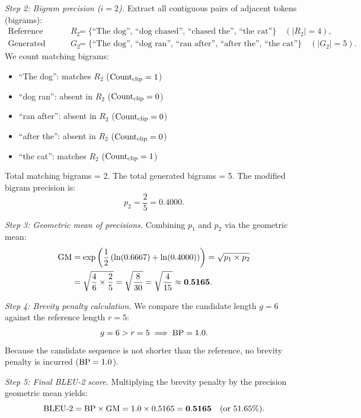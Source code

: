 \documentclass[../../main.tex]{subfiles}
\begin{document}
\textit{Step 2: Bigram precision ($i = 2$).}
Extract all contiguous pairs of adjacent tokens (bigrams):
\begin{align*}
\text{Reference bigrams } R_2 &= \{\text{``The dog''}, \, \text{``dog chased''}, \, \text{``chased the''}, \, \text{``the cat''}\} \quad (|R_2| = 4), \\
\text{Generated bigrams } G_2 &= \{\text{``The dog''}, \, \text{``dog ran''}, \, \text{``ran after''}, \, \text{``after the''}, \, \text{``the cat''}\} \quad (|G_2| = 5).
\end{align*}
We count matching bigrams:
\begin{itemize}
    \item ``The dog'': matches $R_2$ ($\operatorname{Count}_{\text{clip}} = 1$)
    \item ``dog ran'': absent in $R_2$ ($\operatorname{Count}_{\text{clip}} = 0$)
    \item ``ran after'': absent in $R_2$ ($\operatorname{Count}_{\text{clip}} = 0$)
    \item ``after the'': absent in $R_2$ ($\operatorname{Count}_{\text{clip}} = 0$)
    \item ``the cat'': matches $R_2$ ($\operatorname{Count}_{\text{clip}} = 1$)
\end{itemize}
Total matching bigrams = 2. The total generated bigrams = 5. The modified bigram precision is:
\begin{equation}
p_2 = \frac{2}{5} = \mathbf{0.4000}.
\end{equation}

\textit{Step 3: Geometric mean of precisions.}
Combining $p_1$ and $p_2$ via the geometric mean:
\begin{align}
\mathrm{GM} &= \exp\left( \frac{1}{2}\left( \ln(0.6667) + \ln(0.4000) \right) \right) = \sqrt{p_1 \times p_2} \nonumber \\
    &= \sqrt{\frac{4}{6} \times \frac{2}{5}} = \sqrt{\frac{8}{30}} = \sqrt{\frac{4}{15}} \approx \mathbf{0.5165}.
\end{align}

\textit{Step 4: Brevity penalty calculation.}
We compare the candidate length $g = 6$ against the reference length $r = 5$:
\begin{equation}
g = 6 > r = 5 \implies \mathrm{BP} = 1.0.
\end{equation}
Because the candidate sequence is not shorter than the reference, no brevity penalty is incurred ($\mathrm{BP} = 1.0$).

\textit{Step 5: Final BLEU-2 score.}
Multiplying the brevity penalty by the precision geometric mean yields:
\begin{equation}
\mathrm{BLEU}\text{-}2 = \mathrm{BP} \times \mathrm{GM} = 1.0 \times 0.5165 = \mathbf{0.5165} \quad (\text{or } 51.65\%).
\end{equation}
\end{document}
